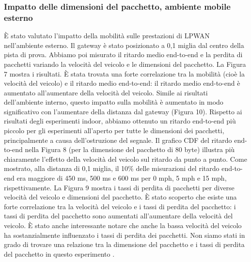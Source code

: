 \documentclass[a4paper]{report} %
\begin{document}
\subsubsection{Impatto delle dimensioni del pacchetto, ambiente mobile esterno}
È stato valutato l'impatto della mobilità sulle prestazioni di LPWAN nell'ambiente esterno. Il gateway è stato posizionato a 0,1 miglia dal centro della pista di prova. Abbiamo poi misurato il ritardo medio end-to-end e la perdita di pacchetti variando la velocità del veicolo e le dimensioni del pacchetto. La Figura 7 mostra i risultati. È stata trovata una forte correlazione tra la mobilità (cioè la velocità del veicolo) e il ritardo medio end-to-end: il ritardo medio end-to-end è aumentato all'aumentare della velocità del veicolo. Simile ai risultati dell'ambiente interno, questo impatto sulla mobilità è aumentato in modo significativo con l'aumentare della distanza dal gateway (Figura 10). Rispetto ai risultati degli esperimenti indoor, abbiamo ottenuto un ritardo end-to-end più piccolo per gli esperimenti all'aperto per tutte le dimensioni dei pacchetti, principalmente a causa dell'ostruzione del segnale. Il grafico CDF del ritardo end-to-end nella Figura 8 (per la dimensione del pacchetto di 80 byte) illustra più chiaramente l'effetto della velocità del veicolo sul ritardo da punto a punto. Come mostrato, alla distanza di 0,1 miglia, il 10\% delle misurazioni del ritardo end-to-end era maggiore di 450 ms, 500 ms e 600 ms per 0 mph, 5 mph e 15 mph, rispettivamente. La Figura 9 mostra i tassi di perdita di pacchetti per diverse velocità del veicolo e dimensioni del pacchetto. È stato scoperto che esiste una forte correlazione tra la velocità del veicolo e i tassi di perdita del pacchetto: i tassi di perdita del pacchetto sono aumentati all'aumentare della velocità del veicolo. È stato anche interessante notare che anche la bassa velocità del veicolo ha sostanzialmente influenzato i tassi di perdita dei pacchetti. Non siamo stati in grado di trovare una relazione tra la dimensione del pacchetto e i tassi di perdita del pacchetto in questo esperimento \cite{art:rif.47}.
\end{document}
